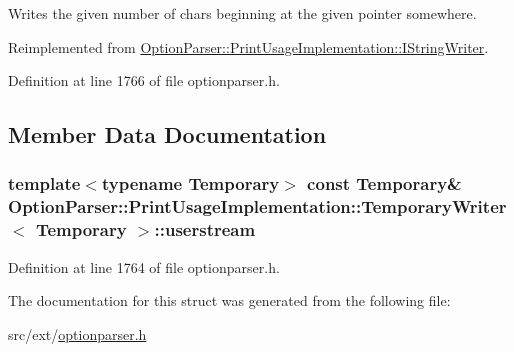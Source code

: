 Writes the given number of chars beginning at the given pointer somewhere. 



Reimplemented from \hyperlink{struct_option_parser_1_1_print_usage_implementation_1_1_i_string_writer_acae5e8911028920188394436f9712251}{Option\-Parser\-::\-Print\-Usage\-Implementation\-::\-I\-String\-Writer}.



Definition at line 1766 of file optionparser.\-h.



\subsection{Member Data Documentation}
\hypertarget{struct_option_parser_1_1_print_usage_implementation_1_1_temporary_writer_ae8dc9ac085535183436307e3d2da6982}{
\subsubsection[{userstream}]{\setlength{\rightskip}{0pt plus 5cm}template$<$typename Temporary$>$ const Temporary\& {\bf Option\-Parser\-::\-Print\-Usage\-Implementation\-::\-Temporary\-Writer}$<$ Temporary $>$\-::userstream}}\label{struct_option_parser_1_1_print_usage_implementation_1_1_temporary_writer_ae8dc9ac085535183436307e3d2da6982}


Definition at line 1764 of file optionparser.\-h.



The documentation for this struct was generated from the following file\-:\begin{DoxyCompactItemize}
\item 
src/ext/\hyperlink{optionparser_8h}{optionparser.\-h}\end{DoxyCompactItemize}
